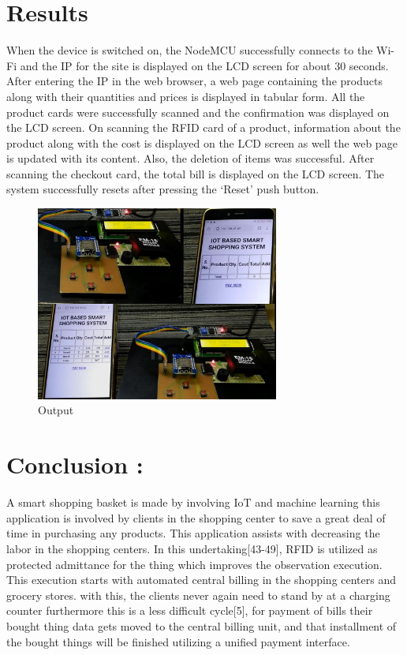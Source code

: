 \documentclass[conference]{IEEEtran}
\begin{document}
\section{Results}
When the device is switched on, the NodeMCU successfully connects to the Wi-Fi and the IP for the site is displayed on the LCD screen for about 30 seconds. After entering the IP in the web browser, a web page containing the products along with their quantities and prices is displayed in tabular form. All the product cards were successfully scanned and the confirmation was displayed on the LCD screen. On scanning the RFID card of a product, information about the product along with the cost is displayed on the LCD screen as well the web page is updated with its content. Also, the deletion of items was successful. After scanning the checkout card, the total bill is displayed on the LCD screen. The system successfully resets after pressing the ‘Reset’ push button.

\begin{figure}[htbp]
	\centerline{\includegraphics[width=80mm]{Iot}}
	\caption{Output}
	\label{fig}
\end{figure}










\section{Conclusion :}
A smart shopping basket is made by involving IoT and machine learning this application is involved by clients in the shopping center to save a great deal of time in purchasing any products. This application assists with decreasing the labor in the shopping centers. In this undertaking[43-49], RFID is utilized as protected admittance for the thing which improves the observation execution. This execution starts with automated central billing in the shopping centers and grocery stores. with this, the clients never again need to stand by at a charging counter furthermore this is a less difficult cycle[5], for payment of bills their bought thing data gets moved to the central billing unit, and that installment of the bought things will be finished utilizing a unified payment interface.
\end{document}
